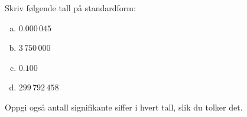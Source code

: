 %
Skriv følgende tall på standardform:
\begin{enumerate}[a)]
    \item $0.000\,045$
    \item $3\,750\,000$
    \item $0.100$
    \item $299\,792\,458$
\end{enumerate}
Oppgi også antall signifikante siffer i hvert tall, slik du tolker det.
